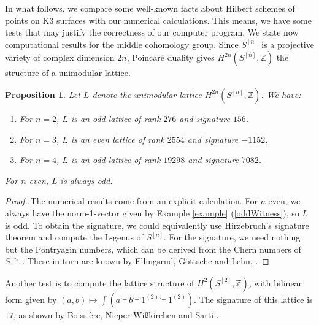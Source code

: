 \documentclass{amsart}
\newcommand{\hilb}[1]{^{[#1]}}
\newcommand{\One}{1}
\newcommand{\IZ}{\mathbb{Z}}
\theoremstyle{plain}
\newtheorem{proposition}[theorem]{Proposition}
\theoremstyle{definition}
\theoremstyle{remark}
\begin{document}
In what follows, we compare some well-known facts about Hilbert schemes of points on K3 surfaces with our numerical calculations. This means, we have some tests that may justify the correctness of our computer program.
We state now computational results for the middle cohomology group. Since $S\hilb{n}$ is a projective variety of complex dimension $2n$, Poincar\'{e} duality gives $H^{2n}(S\hilb{n},\IZ)$ the structure of a unimodular lattice.  
\begin{proposition} Let $L$ denote the unimodular lattice $H^{2n}(S\hilb{n},\IZ)$. We have:
\begin{enumerate}
\item For $n=2$, $L$ is an odd lattice of rank $276$ and signature $156$.
\item For $n=3$, $L$ is an even lattice of rank $2554$ and signature $-1152$.
\item For $n=4$, $L$ is an odd lattice of rank $19298$ and signature $7082$.
\end{enumerate}
For $n$ even, $L$ is always odd. 
\end{proposition} 
\begin{proof}The numerical results come from an explicit calculation. For $n$ even, we always have the norm-1-vector given by Example \ref{example} (\ref{oddWitness}), so $L$ is odd. To obtain the signature, we could equivalently use Hirzebruch's signature theorem and compute the L-genus of $S\hilb{n}$. For the signature, we need nothing but the Pontryagin numbers, which can be derived from the Chern numbers of $S\hilb{n}$. These in turn are known by Ellingsrud, G\"ottsche and Lehn, \cite[Rem. 5.5]{EGL}. 
\end{proof}
Another test is to compute the lattice structure of $H^2(S\hilb{2},\IZ)$, with bilinear form given by $(a,b)\longmapsto \int \left(a\smile b\smile \One^{(2)}\smile \One^{(2)}\right)$. The signature of this lattice is $17$, as shown by Boissi\`ere, Nieper-Wi{\ss}kirchen and Sarti \cite[Lemma 6.9]{BNS}.





\end{document}
